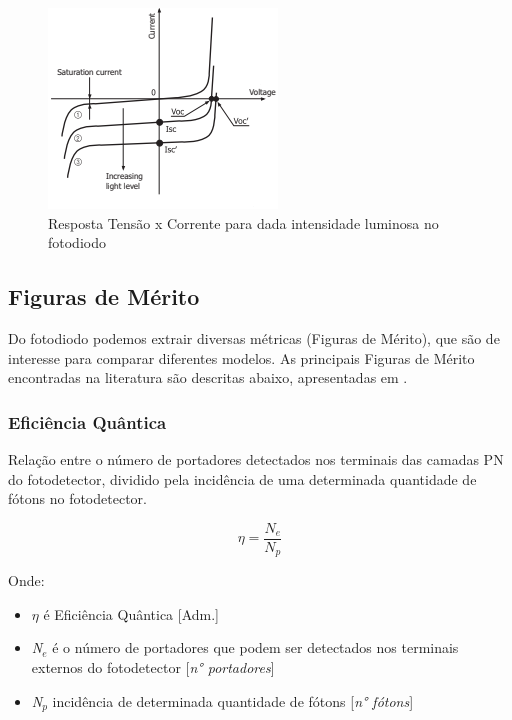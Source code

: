 \begin{figure}[!h]
	\caption{\label{fig_respFotodiodo}Resposta Tensão x Corrente para dada intensidade luminosa no fotodiodo}
	\begin{center}
	    \includegraphics[scale=0.8]{Imagens/graficoRespostaFotodiodo.png}
	\end{center}
\end{figure}

\subsection{Figuras de M\'erito}
Do fotodiodo podemos extrair diversas m\'etricas (Figuras de M\'erito), que são de interesse para comparar diferentes modelos. As principais Figuras de M\'erito encontradas na literatura são descritas abaixo, apresentadas em \cite{LidianeCampos}.

\subsubsection{Eficiência Quântica}
Relação entre o número de portadores detectados nos terminais das camadas PN do fotodetector, dividido pela incidência de uma determinada quantidade de fótons no fotodetector.

\begin{equation}
    \eta = \frac{N_e}{N_p}
\end{equation}

Onde:
\begin{itemize}
    \item \textit{$\eta$} \'e Efici\^encia Qu\^antica [Adm.]
    \item \textit{N$_e$} \'e o n\'umero de portadores que podem ser detectados nos terminais externos do fotodetector [\textit{n° portadores}]
    \item \textit{N$_p$} incid\^encia de determinada quantidade de f\'otons [\textit{n° f\'otons}]
\end{itemize}

